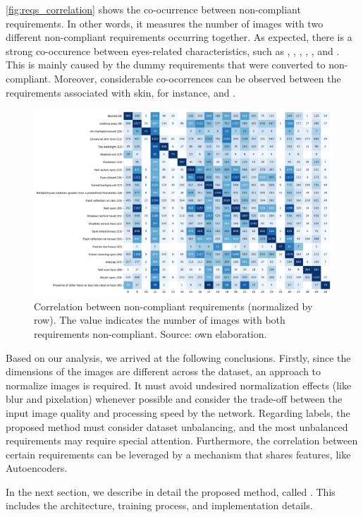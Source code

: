 \autoref{fig:reqs_correlation} shows the co-ocurrence between non-compliant requirements. In other words, it measures the number of images with two different non-compliant requirements occurring together. As expected, there is a strong co-occurence between eyes-related characteristics, such as \lookingaway, \hairacrosseyes, \eyesclosed, \redeyes, \darktintedlenses, and \framecoveringeyes. This is mainly caused by the dummy requirements that were converted to non-compliant. Moreover, considerable co-ocorrences can be observed between the requirements associated with skin, for instance, \unnaturalskintone and \flashskin. 
 
\begin{figure}[tb]
\centering
\includegraphics[width=\linewidth]{images/reqs/reqs_correlation.pdf}
\caption{Correlation between non-compliant requirements (normalized by row). The value indicates the number of images with both requirements non-compliant. Source: own elaboration.}
\label{fig:reqs_correlation}
\end{figure}
 
Based on our analysis, we arrived at the following conclusions. Firstly, since the dimensions of the images are different across the dataset, an approach to normalize images is required. It must avoid undesired normalization effects (like blur and pixelation) whenever possible and consider the trade-off between the input image quality and processing speed by the network. Regarding labels, the proposed method must consider dataset unbalancing, and the most unbalanced requirements may require special attention. Furthermore, the correlation between certain requirements can be leveraged by a mechanism that shares features, like Autoencoders.
 
In the next section, we describe in detail the proposed method, called \methodname. This includes the architecture, training process, and implementation details.
 
